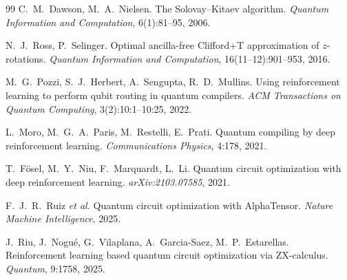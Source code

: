 \begin{thebibliography}{99}
C.~M.~Dawson, M.~A.~Nielsen.
\newblock The {Solovay--Kitaev} algorithm.
\newblock \emph{Quantum Information and Computation}, 6(1):81--95, 2006.

N.~J.~Ross, P.~Selinger.
\newblock Optimal ancilla-free {Clifford+T} approximation of $z$-rotations.
\newblock \emph{Quantum Information and Computation}, 16(11--12):901--953, 2016.

M.~G.~Pozzi, S.~J.~Herbert, A.~Sengupta, R.~D.~Mullins.
\newblock Using reinforcement learning to perform qubit routing in quantum compilers.
\newblock \emph{ACM Transactions on Quantum Computing}, 3(2):10:1--10:25, 2022.

L.~Moro, M.~G.~A.~Paris, M.~Restelli, E.~Prati.
\newblock Quantum compiling by deep reinforcement learning.
\newblock \emph{Communications Physics}, 4:178, 2021.

T.~Fösel, M.~Y.~Niu, F.~Marquardt, L.~Li.
\newblock Quantum circuit optimization with deep reinforcement learning.
\newblock \emph{arXiv:2103.07585}, 2021.

F.~J.~R.~Ruiz \emph{et al.}
\newblock Quantum circuit optimization with {AlphaTensor}.
\newblock \emph{Nature Machine Intelligence}, 2025.

J.~Riu, J.~Nogué, G.~Vilaplana, A.~Garcia-Saez, M.~P.~Estarellas.
\newblock Reinforcement learning based quantum circuit optimization via {ZX}-calculus.
\newblock \emph{Quantum}, 9:1758, 2025.

\end{thebibliography}
